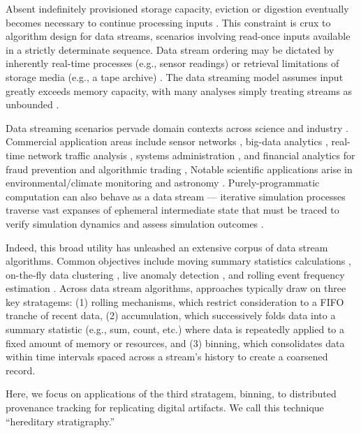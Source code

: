 Absent indefinitely provisioned storage capacity, eviction or digestion eventually becomes necessary to continue processing inputs \citep{gaber2005mining}.
This constraint is crux to algorithm design for data streams, scenarios involving read-once inputs available in a strictly determinate sequence.
Data stream ordering may be dictated by inherently real-time processes (e.g., sensor readings) or retrieval limitations of storage media (e.g., a tape archive) \citep{henzinger1998computing}.
The data streaming model assumes input greatly exceeds memory capacity, with many analyses simply treating streams as unbounded \citep{jiang2006research}.

Data streaming scenarios pervade domain contexts across science and industry \citep{aggarwal2009data,akidau2015dataflow}.
Commercial application areas include sensor networks \citep{elnahrawy2003research}, big-data analytics \citep{he2010comet}, real-time network traffic analysis \citep{johnson2005streams,muthukrishnan2005data}, systems administration \citep{fischer2012real}, and financial analytics for fraud prevention and algorithmic trading \citep{rajeshwari2016real,agarwal2009faster},
Notable scientific applications arise in environmental/climate monitoring \citep{hill2009real} and astronomy \citep{graham2012data}.
Purely-programmatic computation can also behave as a data stream --- iterative simulation processes traverse vast expanses of ephemeral intermediate state that must be traced to verify simulation dynamics and assess simulation outcomes \citep{abdulla2004simulation,schutzel2014stream}.

Indeed, this broad utility has unleashed an extensive corpus of data stream algorithms.
Common objectives include moving summary statistics calculations \citep{lin2004continuously}, on-the-fly data clustering \citep{silva2013data}, live anomaly detection \citep{cai2004maids}, and rolling event frequency estimation \citep{manku2002approximate}.
Across data stream algorithms, approaches typically draw on three key stratagems: (1) rolling mechanisms, which restrict consideration to a FIFO tranche of recent data, (2) accumulation, which successively folds data into a summary statistic (e.g., sum, count, etc.) where data is repeatedly applied to a fixed amount of memory or resources, and (3) binning, which consolidates data within time intervals spaced across a stream's history to create a coarsened record.

Here, we focus on applications of the third stratagem, binning, to distributed provenance tracking for replicating digital artifacts.
We call this technique ``hereditary stratigraphy.''

